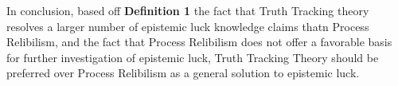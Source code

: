 \documentclass{article}
\begin{document}
In conclusion, based off \textbf{Definition 1} the fact that Truth Tracking theory resolves
a larger number of epistemic luck knowledge claims thatn Process Relibilism, and the fact
that Process Relibilism does not offer a favorable basis for further investigation of
epistemic luck, Truth Tracking Theory should be preferred over Process Relibilism
as a general solution to epistemic luck.
\end{document}
